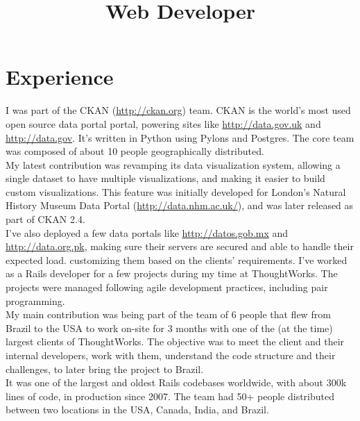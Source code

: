 \documentclass[11pt,a4paper]{moderncv}
\title{Web Developer}               %
\begin{document}
\maketitle


\section{Experience}
{
  I was part of the CKAN (\url{http://ckan.org}) team. CKAN is the world's most
  used open source data portal portal, powering sites like
  \url{http://data.gov.uk} and \url{http://data.gov}. It's written in Python
  using Pylons and Postgres. The core team was composed of about 10 people
  geographically distributed.
  \\
  My latest contribution was revamping its data
  visualization system, allowing a single dataset to have multiple
  visualizations, and making it easier to build custom visualizations. This
  feature was initially developed for London's Natural History Museum Data
  Portal (\url{http://data.nhm.ac.uk/}), and was later released as part of CKAN
  2.4.
  \\
  I've also deployed a few data portals like \url{http://datos.gob.mx} and
  \url{http://data.org.pk}, making sure their servers are secured and able to
  handle their expected load. customizing them based on the clients'
  requirements.
}
{
  I've worked as a Rails developer for a few projects during my time at
  ThoughtWorks. The projects were managed following agile development
  practices, including pair programming.
  \\
  My main contribution was being part of the team of 6 people that flew from
  Brazil to the USA to work on-site for 3 months with one of the (at the time)
  largest clients of ThoughtWorks. The objective was to meet the client and
  their internal developers, work with them, understand the code structure and
  their challenges, to later bring the project to Brazil.
  \\
  It was one of the largest and oldest Rails codebases worldwide, with about
  300k lines of code, in production since 2007. The team had 50+ people
  distributed between two locations in the USA, Canada, India, and Brazil.
}
\end{document}
